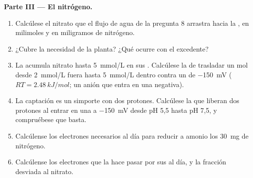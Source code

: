 \begin{problem}
\medskip
\noindent\textbf{Parte III --- El nitrógeno.}
\begin{enumerate}[resume]
  \item Calcúlese el nitrato que el flujo de agua de la pregunta 8 arrastra
        hacia la , en milimoles y en miligramos de nitrógeno.
  \item ¿Cubre la necesidad de la planta? ¿Qué ocurre con el excedente?
  \item La  acumula nitrato hasta \qty{5}{mmol/L} en sus .
        Calcúlese la  de trasladar un mol desde
        \qty{2}{mmol/L} fuera hasta \qty{5}{mmol/L} dentro contra un
         de \qty{-150}{mV} ($RT = \qty{2.48}{kJ/mol}$;
        un anión que entra en una  negativa).
  \item La captación es un simporte con dos protones. Calcúlese la  que liberan dos protones al entrar en una  a
        \qty{-150}{mV} desde pH 5,5 hasta pH 7,5, y compruébese que basta.
  \item Calcúlense los electrones necesarios al día para reducir a amonio
        los \qty{30}{mg} de nitrógeno.
  \item Calcúlense los electrones que la  hace pasar por sus
         al día, y la fracción desviada al nitrato.
\end{enumerate}


\end{problem}
